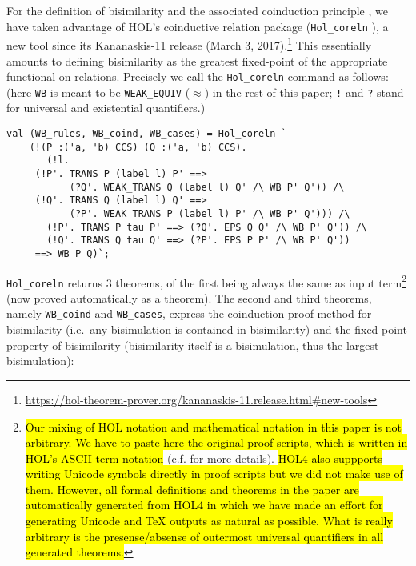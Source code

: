 For the definition of bisimilarity and the associated coinduction
principle \cite{sangiorgi2011advanced}, we have taken
advantage of HOL's coinductive relation package (\texttt{Hol_coreln} \cite{holdesc}),
a new tool since its Kananaskis-11 release (March 3,
2017).\footnote{\url{https://hol-theorem-prover.org/kananaskis-11.release.html\#new-tools}}
This essentially amounts to defining bisimilarity as the greatest
fixed-point of the appropriate functional on relations. 
Precisely we call 
the \texttt{Hol_coreln}
command as follows: (here \texttt{WB} is meant to be
\texttt{WEAK_EQUIV} ($\approx$) in the rest of this paper;
{\tt !} and {\tt ?} stand for universal and
existential quantifiers.)
\begin{lstlisting}
val (WB_rules, WB_coind, WB_cases) = Hol_coreln `
    (!(P :('a, 'b) CCS) (Q :('a, 'b) CCS).
       (!l.
	 (!P'. TRANS P (label l) P' ==>
	       (?Q'. WEAK_TRANS Q (label l) Q' /\ WB P' Q')) /\
	 (!Q'. TRANS Q (label l) Q' ==>
	       (?P'. WEAK_TRANS P (label l) P' /\ WB P' Q'))) /\
       (!P'. TRANS P tau P' ==> (?Q'. EPS Q Q' /\ WB P' Q')) /\
       (!Q'. TRANS Q tau Q' ==> (?P'. EPS P P' /\ WB P' Q'))
     ==> WB P Q)`;
\end{lstlisting}
\texttt{Hol_coreln} returns 3 theorems, of the first being always the
same as input term\footnote{\hl{Our mixing of HOL notation and mathematical
  notation in this paper is not arbitrary. We have to paste here the
  original proof scripts, which is written in HOL's ASCII term
  notation} (c.f. \cite{holdesc} for more details). \hl{HOL4 also suppports writing Unicode symbols directly in
  proof scripts but we did not make use of them. However, all formal definitions and
  theorems in the paper are automatically generated from HOL4 in
  which we have made an effort for generating
  Unicode and TeX outputs as natural as possible. What is really
  arbitrary is the presense/absense of outermost universal
  quantifiers in all generated theorems.}} (now proved automatically as a theorem).
The second and third theorems, namely \texttt{WB_coind} and \texttt{WB_cases},
express the coinduction proof method for bisimilarity 
(i.e.~any bisimulation is contained in bisimilarity)
and the fixed-point property of bisimilarity
(bisimilarity itself is a bisimulation, thus the largest
bisimulation):
